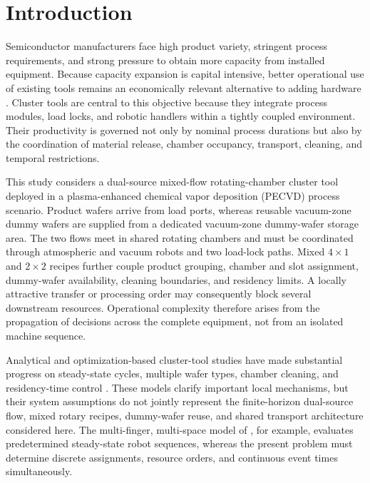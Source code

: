 \documentclass[preprint,12pt,authoryear]{elsarticle}
\begin{document}
\linenumbers

\section{Introduction}
\label{sec:introduction}

Semiconductor manufacturers face high product variety, stringent process
requirements, and strong pressure to obtain more capacity from installed
equipment. Because capacity expansion is capital intensive, better operational
use of existing tools remains an economically relevant alternative to adding
hardware \citep{chien2021drlhga,hong2026ddpgct}. Cluster tools are central to
this objective because they integrate process modules, load locks, and robotic
handlers within a tightly coupled environment. Their productivity is governed
not only by nominal process durations but also by the coordination of material
release, chamber occupancy, transport, cleaning, and temporal restrictions.

This study considers a dual-source mixed-flow rotating-chamber cluster tool
deployed in a plasma-enhanced chemical vapor deposition (PECVD) process
scenario. Product wafers arrive from load ports, whereas reusable vacuum-zone
dummy wafers are supplied from a dedicated vacuum-zone dummy-wafer storage
area. The two flows meet in shared rotating chambers and must be coordinated
through atmospheric and vacuum robots and two load-lock paths. Mixed
$4\times1$ and $2\times2$ recipes further couple product grouping, chamber and
slot assignment, dummy-wafer availability, cleaning boundaries, and residency
limits. A locally attractive transfer or processing order may consequently
block several downstream resources. Operational complexity therefore arises
from the propagation of decisions across the complete equipment, not from an
isolated machine sequence.

Analytical and optimization-based cluster-tool studies have made substantial
progress on steady-state cycles, multiple wafer types, chamber cleaning, and
residency-time control
\citep{kim2021integrated,ko2021wafer,qiao2022binary,lee2023cleaningplan,
li2022conditioncleaning,wang2023optimalcyclic,li2025cyclicmultitype,
yang2025miptwowafers}. These models clarify important local mechanisms, but
their system assumptions do not jointly represent the finite-horizon
dual-source flow, mixed rotary recipes, dummy-wafer reuse, and shared transport
architecture considered here. The multi-finger, multi-space model of
\citet{gu2024multifinger}, for example, evaluates predetermined steady-state
robot sequences, whereas the present problem must determine discrete
assignments, resource orders, and continuous event times simultaneously.
\end{document}
